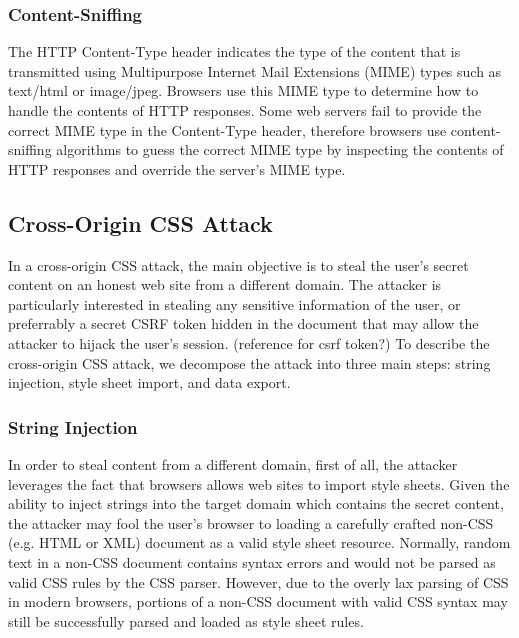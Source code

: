 \documentclass{acm_proc_article-sp}
\begin{document}
\subsubsection{Content-Sniffing}
The HTTP Content-Type header indicates the type of the content that is transmitted using Multipurpose Internet Mail Extensions (MIME)\cite{mime} types such as text/html or image/jpeg. Browsers use this MIME type to determine how to handle the contents of HTTP responses. Some web servers fail to provide the correct MIME type in the Content-Type header, therefore browsers use content-sniffing algorithms to guess the correct MIME type by inspecting the contents of HTTP responses and override the server's MIME type. 

\subsection{Cross-Origin CSS Attack}
In a cross-origin CSS attack, the main objective is to steal the user's secret content on an honest web site from a different domain. The attacker is particularly interested in stealing any sensitive information of the user, or preferrably a secret CSRF token hidden in the document that may allow the attacker to hijack the user's session. 
(reference for csrf token?)
To describe the cross-origin CSS attack, we decompose the attack into three main steps: string injection, style sheet import, and data export.

\subsubsection{String Injection}
In order to steal content from a different domain, first of all, the attacker leverages the fact that browsers allows web sites to import style sheets. Given the ability to inject strings into the target domain which contains the secret content, the attacker may fool the user's browser to loading a carefully crafted non-CSS (e.g. HTML or XML) document as a valid style sheet resource. Normally, random text in a non-CSS document contains syntax errors and would not be parsed as valid CSS rules by the CSS parser. However, due to the overly lax parsing of CSS in modern browsers, portions of a non-CSS document with valid CSS syntax may still be successfully parsed and loaded as style sheet rules.
\end{document}
